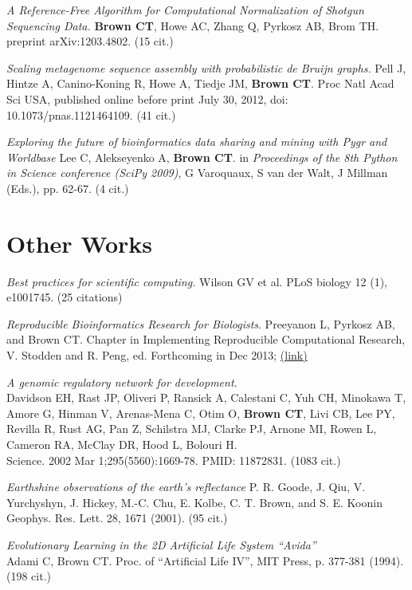 \documentclass[margin,line]{resume}
\begin{document}
\begin{resume}
{\em A Reference-Free Algorithm for Computational Normalization of Shotgun Sequencing Data.} {\bf Brown CT}, Howe AC, Zhang Q, Pyrkosz AB, Brom TH. preprint arXiv:1203.4802. (15 cit.)

{\em Scaling metagenome sequence assembly with probabilistic de Bruijn
graphs.} Pell J, Hintze A, Canino-Koning R, Howe A, Tiedje JM, {\bf Brown
  CT}. Proc Natl Acad Sci USA, published online before print July 30,
  2012, doi: 10.1073/pnas.1121464109. (41 cit.)

{\em Exploring the future of bioinformatics data sharing and mining
  with Pygr and Worldbase} Lee C, Alekseyenko A, {\bf Brown CT}.  in {\em
  Proceedings of the 8th Python in Science conference (SciPy 2009)}, G
Varoquaux, S van der Walt, J Millman (Eds.), pp. 62-67.  (4 cit.)

\newpage

    \section{\mysidestyle Other Works}

{\em Best practices for scientific computing.} Wilson GV et al. PLoS biology 12 (1), e1001745.  (25 citations)

{\em Reproducible Bioinformatics Research for Biologists}.  Preeyanon
L, Pyrkosz AB, and Brown CT. Chapter in Implementing Reproducible
Computational Research, V. Stodden and R. Peng, ed.  Forthcoming in
Dec 2013; \href{https://osf.io/api/v1/project/pk46g/files/download/Brown_chapter.pdf/version/1/}{(link)}

{\em A genomic
regulatory network for development.}\\
Davidson EH, Rast JP, Oliveri P, Ransick A, Calestani C, Yuh CH,
Minokawa T, Amore G, Hinman V, Arenas-Mena C, Otim O, {\bf Brown CT}, Livi
CB, Lee PY, Revilla R, Rust AG, Pan Z, Schilstra MJ, Clarke PJ, Arnone
MI, Rowen L, Cameron RA, McClay DR, Hood L, Bolouri H.
\\Science. 2002 Mar
1;295(5560):1669-78.  PMID: 11872831. (1083 cit.)

{\em Earthshine observations of the earth's reflectance}
P. R. Goode, J. Qiu, V. Yurchyshyn, J. Hickey, M.-C. Chu, E. Kolbe, C. T. Brown, and S. E. Koonin
Geophys. Res. Lett. 28, 1671 (2001). (95 cit.)

{\em Evolutionary Learning in the 2D Artificial Life System ``Avida''}\\
Adami C, Brown CT. Proc. of ``Artificial Life IV'', MIT Press, p. 377-381
(1994).  (198 cit.)


\end{resume}
\end{document}

